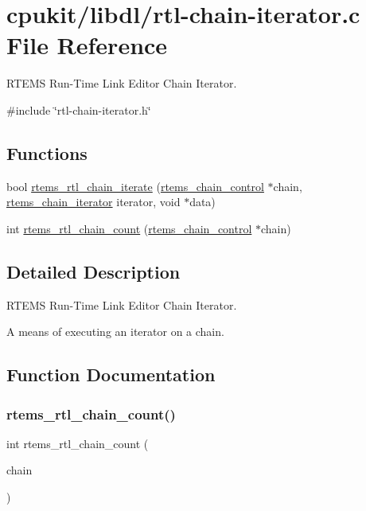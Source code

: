 \hypertarget{rtl-chain-iterator_8c}{}\section{cpukit/libdl/rtl-\/chain-\/iterator.c File Reference}
\label{rtl-chain-iterator_8c}


R\+T\+E\+MS Run-\/\+Time Link Editor Chain Iterator.  


{\ttfamily \#include \char`\"{}rtl-\/chain-\/iterator.\+h\char`\"{}}\newline
\subsection*{Functions}
\begin{DoxyCompactItemize}
\item 
bool \mbox{\hyperlink{rtl-chain-iterator_8c_aa16454dff4035ca37c6a6f68c4b4ce6b}{rtems\+\_\+rtl\+\_\+chain\+\_\+iterate}} (\mbox{\hyperlink{unionChain__Control}{rtems\+\_\+chain\+\_\+control}} $\ast$chain, \mbox{\hyperlink{rtl-chain-iterator_8h_a4a6076e3f99c2cd93d4cec1b50199f45}{rtems\+\_\+chain\+\_\+iterator}} iterator, void $\ast$data)
\item 
int \mbox{\hyperlink{rtl-chain-iterator_8c_abba44d4b003ea714cc986e27e454f76e}{rtems\+\_\+rtl\+\_\+chain\+\_\+count}} (\mbox{\hyperlink{unionChain__Control}{rtems\+\_\+chain\+\_\+control}} $\ast$chain)
\end{DoxyCompactItemize}


\subsection{Detailed Description}
R\+T\+E\+MS Run-\/\+Time Link Editor Chain Iterator. 

A means of executing an iterator on a chain. 

\subsection{Function Documentation}
\mbox{\label{rtl-chain-iterator_8c_abba44d4b003ea714cc986e27e454f76e}} 
\subsubsection{\texorpdfstring{rtems\_rtl\_chain\_count()}{rtems\_rtl\_chain\_count()}}
{\footnotesize\ttfamily int rtems\+\_\+rtl\+\_\+chain\+\_\+count (\begin{DoxyParamCaption}\item[{\mbox{\hyperlink{unionChain__Control}{rtems\+\_\+chain\+\_\+control}} $\ast$}]{chain }\end{DoxyParamCaption})}

